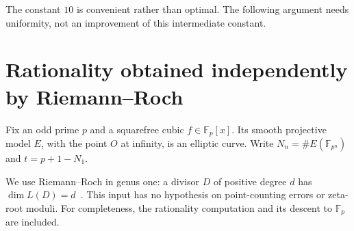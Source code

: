 \documentclass[11pt]{amsart}
\theoremstyle{definition}
\theoremstyle{remark}
\newcommand{\F}{\mathbb F}
\begin{document}
The constant $10$ is convenient rather than optimal. The following argument needs uniformity, not an improvement of this intermediate constant.

\section{Rationality obtained independently by Riemann--Roch}\label{sec:rationality}

Fix an odd prime $p$ and a squarefree cubic $f\in\F_p[x]$. Its smooth projective model $E$, with the point $O$ at infinity, is an elliptic curve. Write $N_n=\#E(\F_{p^n})$ and $t=p+1-N_1$.

We use Riemann--Roch in genus one: a divisor $D$ of positive degree $d$ has $\dim L(D)=d$~\cite[I, Thm.~4.13, pp.~35--36]{Mil20}. This input has no hypothesis on point-counting errors or zeta-root moduli. For completeness, the rationality computation and its descent to $\F_p$ are included.
\end{document}
